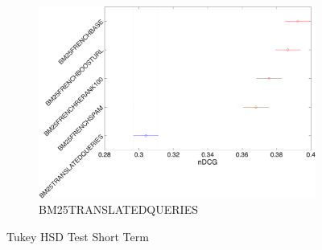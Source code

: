 \begin{figure}[tb]
\begin{subfigure}[b]{0.49\textwidth}
         \includegraphics[width=\textwidth]{figure/shortterm/tukeyhsd-5.png}
         \caption{BM25TRANSLATEDQUERIES}
         \label{fig:sthsd5}
     \end{subfigure}
        \caption{Tukey HSD Test Short Term}
        \label{fig:sthsd}
\end{figure}


